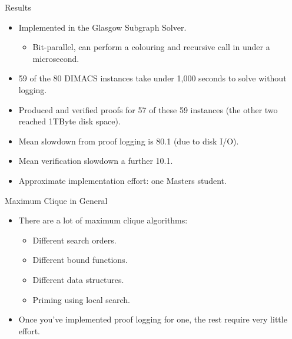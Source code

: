 \documentclass{beamer}
\begin{document}
\begin{frame}{Results}
    \begin{itemize}
        \item Implemented in the Glasgow Subgraph Solver.
            \begin{itemize}
                \item Bit-parallel, can perform a colouring and recursive call in under a microsecond.
            \end{itemize}
        \item 59 of the 80 DIMACS instances take under 1,000 seconds to solve without logging.
        \item Produced and verified proofs for 57 of these 59 instances (the other two reached
            1TByte disk space).
        \item Mean slowdown from proof logging is 80.1 (due to disk I/O).
        \item Mean verification slowdown a further 10.1.
        \item Approximate implementation effort: one Masters student.
    \end{itemize}
\end{frame}

\begin{frame}{Maximum Clique in General}
    \begin{itemize}
        \item There are a lot of maximum clique algorithms:
            \begin{itemize}
                \item Different search orders.
                \item Different bound functions.
                \item Different data structures.
                \item Priming using local search.
            \end{itemize}
        \item Once you've implemented proof logging for one, the rest require very little effort.
    \end{itemize}
\end{frame}
\end{document}
